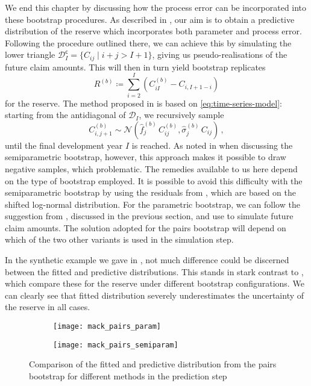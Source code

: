 \documentclass[a4paper]{book}
\begin{document}
We end this chapter by discussing how the process error can be incorporated into these bootstrap procedures. As described in , our aim is to obtain a predictive distribution of the reserve which incorporates both parameter and process error. Following the procedure outlined there, we can achieve this by simulating the lower triangle $\mathcal{D}^{\mathsf{c}}_I = \{ C_{ij} \mid i + j > I + 1 \}$, giving us pseudo-realisations of the future claim amounts. This will then in turn yield bootstrap replicates
\begin{equation}
    R^{(b)} \coloneqq \sum_{i = 2}^I (C^{(b)}_{iI} - C_{i, I + 1 - i})
\end{equation}
\noindent for the reserve. The method proposed in \cite{england:dist} is based on \eqref{eq:time-series-model}: starting from the antidiagonal of $\mathcal{D}_I$, we recursively sample
\begin{equation} \label{eq:normal-sampling}
    C^{(b)}_{i, j + 1} \sim \mathcal{N}(\widehat{f}^{(b)}_j \, C^{(b)}_{ij}, \widehat{\sigma}^{(b)}_j \, C_{ij}) \,,
\end{equation}
until the final development year $I$ is reached. As noted in  when discussing the semiparametric bootstrap, however, this approach makes it possible to draw negative samples, which problematic. The remedies available to us here depend on the type of bootstrap employed. It is possible to avoid this difficulty with the semiparametric bootstrap by using the residuals from , which are based on the shifted log-normal distribution. For the parametric bootstrap, we can follow the suggestion from \cite{england:dist}, discussed in the previous section, and use  to simulate future claim amounts. The solution adopted for the pairs bootstrap will depend on which of the two other variants is used in the simulation step.

In the synthetic example we gave in , not much difference could be discerned between the fitted and predictive distributions. This stands in stark contrast to , which compare these for the reserve under different bootstrap configurations. We can clearly see that fitted distribution severely underestimates the uncertainty of the reserve in all cases.

\vspace{-0.39cm}

\begin{figure}[!htb]
  \begin{subfigure}{0.45 \textwidth}
    \texttt{[image: mack\_pairs\_param]}
  \end{subfigure}
  \begin{subfigure}{0.45 \textwidth}
    \texttt{[image: mack\_pairs\_semiparam]}
  \end{subfigure}
  \caption{Comparison of the fitted and predictive distribution from the pairs bootstrap for different methods in the prediction step}
  \label{fig:fit-pred-pairs}
\end{figure}
\end{document}
